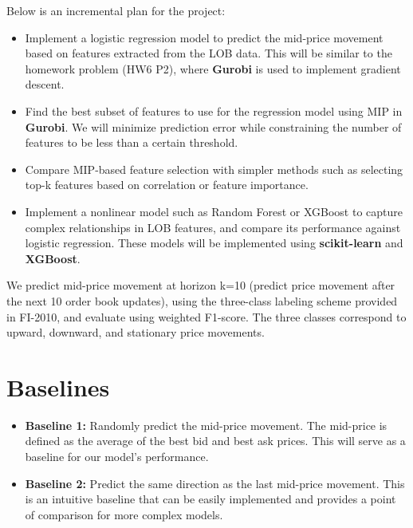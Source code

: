 \documentclass[11pt]{article}
\begin{document}
Below is an incremental plan for the project:
\begin{itemize}
    \item Implement a logistic regression model to predict the mid-price movement based on features extracted from the LOB data. This will be similar to the homework problem (HW6 P2), where \textbf{Gurobi} is used to implement gradient descent.
    \item Find the best subset of features to use for the regression model using MIP in \textbf{Gurobi}. We will minimize prediction error while constraining the number of features to be less than a certain threshold.
    \item Compare MIP-based feature selection with simpler methods such as selecting top-k features based on correlation or feature importance.
    \item Implement a nonlinear model such as Random Forest or XGBoost to capture complex relationships in LOB features, and compare its performance against logistic regression. These models will be implemented using \textbf{scikit-learn} and \textbf{XGBoost}.
\end{itemize}

We predict mid-price movement at horizon k=10 (predict price movement after the next 10 order book updates), using the three-class labeling scheme provided in FI-2010, and evaluate using weighted F1-score. The three classes correspond to upward, downward, and stationary price movements.


\section*{Baselines}
\begin{itemize}
    \item \textbf{Baseline 1:} Randomly predict the mid-price movement. The mid-price is defined as the average of the best bid and best ask prices. This will serve as a baseline for our model's performance.
    \item \textbf{Baseline 2:} Predict the same direction as the last mid-price movement. This is an intuitive baseline that can be easily implemented and provides a point of comparison for more complex models.
\end{itemize}
\end{document}
